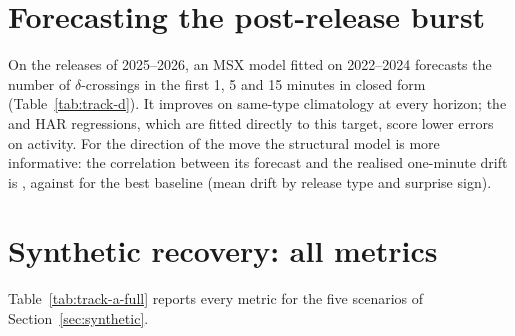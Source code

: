 \section{Forecasting the post-release burst}\label{app:forecast}
On the \nTestReleases{} releases of 2025--2026, an MSX model fitted on 2022--2024 forecasts
the number of $\delta$-crossings in the first 1, 5 and 15 minutes in closed form
(Table~\ref{tab:track-d}). It improves on same-type climatology at every horizon; the
\bestActivityModel{} and HAR regressions, which are fitted directly to this target, score lower
errors on activity. For the direction of the move the structural model is more informative: the correlation between its
forecast and the realised one-minute drift is \driftCorrOursOne{}, against \driftCorrBaseOne{}
for the best baseline (mean drift by release type and surprise sign).

\begin{table}[!htbp]\centering\small
\caption{Post-release activity forecasts on the \nTestReleases{} test releases of
2025--2026, from models fitted on 2022--2024. $N$ is the number of $\delta$-crossings after the
release; QLIKE scores the forecast of realised variance. Mean over assets; lower is better. Bold:
best; underlined: second best; shaded: our model.}\label{tab:track-d}
\setlength{\tabcolsep}{5pt}

\end{table}

\section{Synthetic recovery: all metrics}\label{app:synthetic}
Table~\ref{tab:track-a-full} reports every metric for the five scenarios of Section~\ref{sec:synthetic}.

\begin{table}[!tp]\centering\footnotesize
\caption{Synthetic recovery, all metrics (mean $\pm$ s.d.\ over five seeds):
relative error of the branching matrix and of its spectral radius, kernel $L^1$ error and held-out
deficit dLL ($10^{-3}$ nats/event), all lower is better, and edge AUC (higher is better). AUC needs
absent true edges, so it is defined only for S4 and S5 (n/a for the complete graphs S1--S3).
``--'': not produced by the method; NPHC estimates only the branching matrix. Missing rows are fits
that did not converge. Bold: best; underlined: second best within each scenario; shaded: ours.}\label{tab:track-a-full}
\scriptsize\setlength{\tabcolsep}{5pt}\renewcommand{\arraystretch}{1.0}

\end{table}

